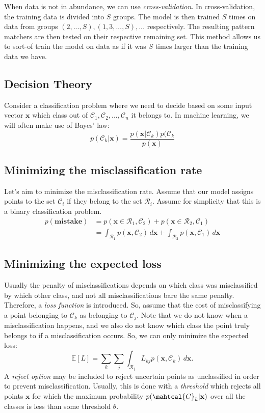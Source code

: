 \documentclass[11pt]{article}
\begin{document}
When data is not in abundance, we can use \textit{cross-validation}. In
cross-validation, the training data is divided into $S$ groups. The model is
then trained $S$ times on data from groups $(2, ..., S), (1, 3, ..., S), ...$
respectively. The resulting pattern matchers are then tested on their
respective remaining set. This method allows us to sort-of train the model
on data as if it was $S$ times larger than the training data we have.
\subsection{Decision Theory}
Consider a classification problem where we need to decide based on some input
vector $\textbf{x}$ which class out of
$\mathcal{C}_1, \mathcal{C}_2, ..., \mathcal{C}_n$ it belongs to. In machine
learning, we will often make use of Bayes' law:
\begin{equation*}
  p(\mathcal{C}_k | \textbf{x}) =
  \frac{p(\textbf{x}|\mathcal{C}_k)p(\mathcal{C}_k}{p(\textbf{x})}
\end{equation*}
\subsection{Minimizing the misclassification rate}
Let's aim to minimize the misclassification rate. Assume that our model assigns
points to the set $\mathcal{C}_i$ if they belong to the set $\mathcal{R}_i$.
Assume for simplicity that this is a binary classification problem.
\begin{align*}
  p(\textbf{mistake}) &= p(\textbf{x} \in \mathcal{R}_1, \mathcal{C}_2)
  + p(\textbf{x} \in \mathcal{R}_2, \mathcal{C}_1)\\
  &= \int_{\mathcal{R}_1} p(\textbf{x}, \mathcal{C}_2) \,d\mathbf{x}
  + \int_{\mathcal{R}_2} p(\textbf{x}, \mathcal{C}_1) \,d\mathbf{x}
\end{align*}
\subsection{Minimizing the expected loss}
Usually the penalty of misclassifications depends on which class was
misclassified by which other class, and not all misclassifications bare the
same penalty. Therefore, a \textit{loss function} is introduced. So, assume
that the cost of misclassifying a point belonging to $\mathcal{C}_k$ as
belonging to $\mathcal{C}_j$. Note that we do not know when a misclassification
happens, and we also do not know which class the point truly belongs to if a
misclassification occurs. So, we can only minimize the expected loss:
\begin{equation*}
  \mathbb{E}[L] = \sum_k \sum_j \int_{\mathcal{R}_j} L_{kj}
  p(\textbf{x}, \mathcal{C}_k) \,d\textbf{x}.
\end{equation*}
A \textit{reject option} may be included to reject uncertain points as
unclassified in order to prevent misclassification. Usually, this is done with
a \textit{threshold} which rejects all points $\textbf{x}$ for which the
maximum probability $p(\mahtcal{C}_k | \textbf{x})$ over all the classes is
less than some threshold $\theta$.
\end{document}
